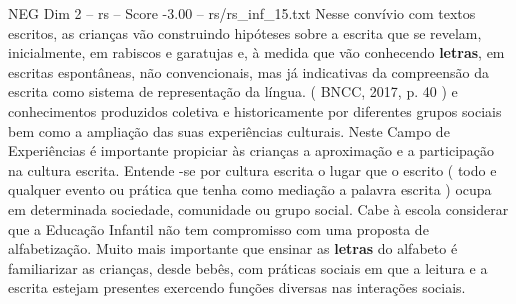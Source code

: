 \begin{textsample}{NEG Dim 2 – rs – Score -3.00 – rs/rs\_inf\_15.txt}
Nesse convívio com textos escritos, as crianças vão construindo hipóteses sobre a escrita que se revelam, inicialmente, em rabiscos e garatujas e, à medida que vão conhecendo \textbf{letras}, em escritas espontâneas, não convencionais, mas já indicativas da compreensão da escrita como sistema de representação da língua. ( BNCC, 2017, p. 40 ) e conhecimentos produzidos coletiva e historicamente por diferentes grupos sociais bem como a ampliação das suas experiências culturais.
Neste Campo de Experiências é importante propiciar às crianças a aproximação e a participação na cultura escrita.
Entende -se por cultura escrita o lugar que o escrito ( todo e qualquer evento ou prática que tenha como mediação a palavra escrita ) ocupa em determinada sociedade, comunidade ou grupo social.
Cabe à escola considerar que a Educação Infantil não tem compromisso com uma proposta de alfabetização.
Muito mais importante que ensinar as \textbf{letras} do alfabeto é familiarizar as crianças, desde bebês, com práticas sociais em que a leitura e a escrita estejam presentes exercendo funções diversas nas interações sociais.

\end{textsample}

